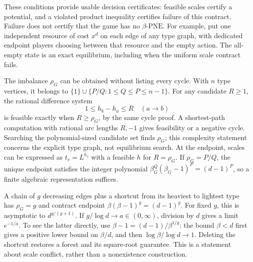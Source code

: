 \documentclass[manuscript,review,anonymous]{acmart}
\newcommand{\PNE}{\mathrm{PNE}}
\begin{document}
These conditions provide usable decision certificates: feasible scales certify a potential, and a violated product inequality certifies failure of this contract. Failure does not certify that the game has no $\beta$-$\PNE$. For example, put one independent resource of cost $x^d$ on each edge of any type graph, with dedicated endpoint players choosing between that resource and the empty action. The all-empty state is an exact equilibrium, including when the uniform scale contract fails.

The imbalance $\rho_G$ can be obtained without listing every cycle. With $n$ type vertices, it belongs to $\{1\}\cup\{P/Q:1\le Q\le P\le n-1\}$. For any candidate $R\ge1$, the rational difference system
\[
 1\le h_b-h_a\le R\quad(a\to b)
\]
is feasible exactly when $R\ge\rho_G$, by the same cycle proof. A shortest-path computation with rational arc lengths $R,-1$ gives feasibility or a negative cycle. Searching the polynomial-sized candidate set finds $\rho_G$; this complexity statement concerns the explicit type graph, not equilibrium search. At the endpoint, scales can be expressed as $t_v=L^{h_v}$ with a feasible $h$ for $R=\rho_G$. If $\rho_G=P/Q$, the unique endpoint satisfies the integer polynomial $\beta_G^Q(\beta_G-1)^P=(d-1)^P$, so a finite algebraic representation suffices.

A chain of $g$ decreasing edges plus a shortcut from its heaviest to lightest type has $\rho_G=g$ and contract endpoint $\beta(\beta-1)^g=(d-1)^g$. For fixed $g$, this is asymptotic to $d^{g/(g+1)}$. If $g/\log d\to a\in(0,\infty)$, division by $d$ gives a limit $e^{-1/a}$. To see the latter directly, use $\beta-1=(d-1)/\beta^{1/g}$: the bound $\beta<d$ first gives a positive lower bound on $\beta/d$, and then $\log\beta/\log d\to1$. Deleting the shortcut restores a forest and its square-root guarantee. This is a statement about scale conflict, rather than a nonexistence construction.
\end{document}

